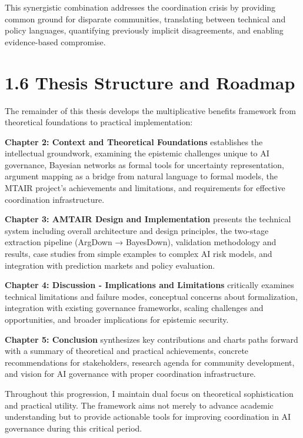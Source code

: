 \documentclass[
  11pt,
  letterpaper,
]{book}
\begin{document}
This synergistic combination addresses the coordination crisis by
providing common ground for disparate communities, translating between
technical and policy languages, quantifying previously implicit
disagreements, and enabling evidence-based compromise.

\section*{1.6 Thesis Structure and Roadmap}\label{sec-roadmap}


The remainder of this thesis develops the multiplicative benefits
framework from theoretical foundations to practical implementation:

\textbf{Chapter 2: Context and Theoretical Foundations} establishes the
intellectual groundwork, examining the epistemic challenges unique to AI
governance, Bayesian networks as formal tools for uncertainty
representation, argument mapping as a bridge from natural language to
formal models, the MTAIR project's achievements and limitations, and
requirements for effective coordination infrastructure.

\textbf{Chapter 3: AMTAIR Design and Implementation} presents the
technical system including overall architecture and design principles,
the two-stage extraction pipeline (ArgDown → BayesDown), validation
methodology and results, case studies from simple examples to complex AI
risk models, and integration with prediction markets and policy
evaluation.

\textbf{Chapter 4: Discussion - Implications and Limitations} critically
examines technical limitations and failure modes, conceptual concerns
about formalization, integration with existing governance frameworks,
scaling challenges and opportunities, and broader implications for
epistemic security.

\textbf{Chapter 5: Conclusion} synthesizes key contributions and charts
paths forward with a summary of theoretical and practical achievements,
concrete recommendations for stakeholders, research agenda for community
development, and vision for AI governance with proper coordination
infrastructure.

Throughout this progression, I maintain dual focus on theoretical
sophistication and practical utility. The framework aims not merely to
advance academic understanding but to provide actionable tools for
improving coordination in AI governance during this critical period.
\end{document}
